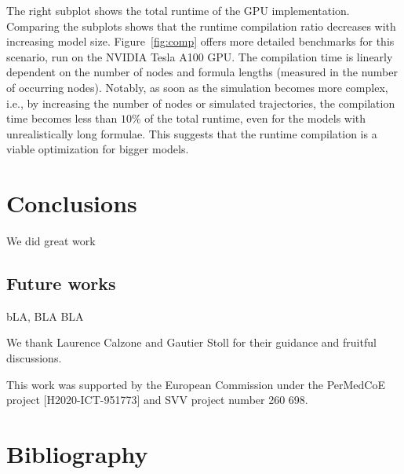\documentclass[times, twoside]{zHenriquesLab-StyleBioRxiv}
\begin{document}
The right subplot shows the total runtime of the GPU implementation. Comparing the subplots shows that the runtime compilation ratio decreases with increasing model size. Figure~\ref{fig:comp} offers more detailed benchmarks for this scenario, run on the NVIDIA Tesla A100 GPU. The compilation time is linearly dependent on the number of nodes and formula lengths (measured in the number of occurring nodes). Notably, as soon as the simulation becomes more complex, i.e., by increasing the number of nodes or simulated trajectories, the compilation time becomes less than $10\%$ of the total runtime, even for the models with unrealistically long formulae. This suggests that the runtime compilation is a viable optimization for bigger models.


\section*{Conclusions}

We did great work\\

\subsection*{Future works} 
bLA, BLA BLA


\begin{acknowledgements}
We thank Laurence Calzone and Gautier Stoll for their guidance and fruitful discussions.
\end{acknowledgements}

\begin{funding}
This work was supported by the European Commission under the PerMedCoE project [H2020-ICT-951773] and SVV project number 260 698.
\end{funding}


\section*{Bibliography}


\onecolumn
\newpage


\end{document}
